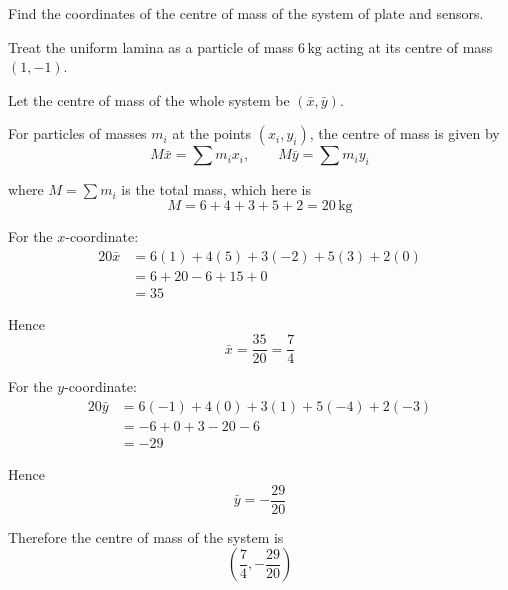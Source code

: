 \documentclass[leqno]{article}
\begin{document}
\begin{enumerate}[
  label=\textbf{\arabic*.},
  leftmargin=*,
  topsep=0pt,
  partopsep=0pt,
  parsep=0pt
]
Find the coordinates of the centre of mass of the system of plate and sensors.  \\

\vspace*{10pt}

\begin{djsSolution}
Treat the uniform lamina as a particle of mass $6\,\mathrm{kg}$ acting at its centre of mass $(1,-1)$.

Let the centre of mass of the whole system be $(\bar{x},\bar{y})$.

For particles of masses $m_i$ at the points $(x_i,y_i)$, the centre of mass is given by
\[
M\bar{x}=\sum m_ix_i,\qquad M\bar{y}=\sum m_iy_i
\]

where $M=\sum m_i$ is the total mass, which here is
\[
M=6+4+3+5+2=20\,\mathrm{kg}
\]

For the $x$-coordinate:
\begin{align*}
20\bar{x}
&=6(1)+4(5)+3(-2)+5(3)+2(0)\\
&=6+20-6+15+0\\
&=35
\end{align*}

Hence
\[
\bar{x}=\frac{35}{20}=\frac{7}{4}
\]

For the $y$-coordinate:
\begin{align*}
20\bar{y}
&=6(-1)+4(0)+3(1)+5(-4)+2(-3)\\
&=-6+0+3-20-6\\
&=-29
\end{align*}

Hence
\[
\bar{y}=-\frac{29}{20}
\]

Therefore the centre of mass of the system is
\[
\left(\frac{7}{4},-\frac{29}{20}\right)
\]
\end{djsSolution}


\newpage

\questionitem

\begin{figure}[H]
    \centering
{}
\end{figure}
\end{enumerate}
\end{document}

